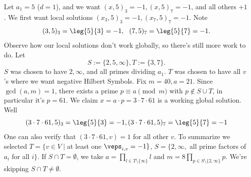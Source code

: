 Let $a_1=5$ ($d=1$), and we want $(x,5)_3=-1,(x,5)_7=-1$, and all others $+1$. We first want local solutions $(x_3,5)_3=-1,(x_7,5)_7=-1$. Note
$$(3,5)_3 =\leg{5}{3}=-1,\:\:\: (7,5)_7=\leg{5}{7}=-1.$$
Observe how our local solutions don't work globally, so there's still more work to do. Let
$$S:=\{2,5,\infty\},T:=\{3,7\}.$$
$S$ was chosen to have $2,\infty$, and all primes dividing $a_1$. $T$ was chosen to have all $v$'s where we want negative Hilbert Symbols. Fix $m=40,a=21$. Since $\gcd(a,m)=1$, there exists a prime $p \equiv a \pmod m$ with $p \not \in S \cup T$, in particular it's $p=61$. We claim $x = a \cdot p = 3 \cdot 7 \cdot 61$ is a working global solution. Well
$$(3\cdot 7 \cdot 61,5)_3=\leg{5}{3}=-1, (3 \cdot 7 \cdot 61,5)_7 = \leg{5}{7}=-1$$
One can also verify that $(3 \cdot 7 \cdot 61,v)=1$ for all other $v$. To summarize we selected $T = \{ v\in V \mid$at least one $\veps_{i,v}=-1\}$, $S = \{2,\infty,$ all prime factors of $a_{i}$ for all $i\}$. If $S \cap T = \emptyset$, we take $a = \prod_{l\in T\setminus\{\infty\}}l$ and $m=8 \prod _{p \in S\setminus\{2,\infty\}}p$. We're skipping $S \cap T \neq \emptyset$.
